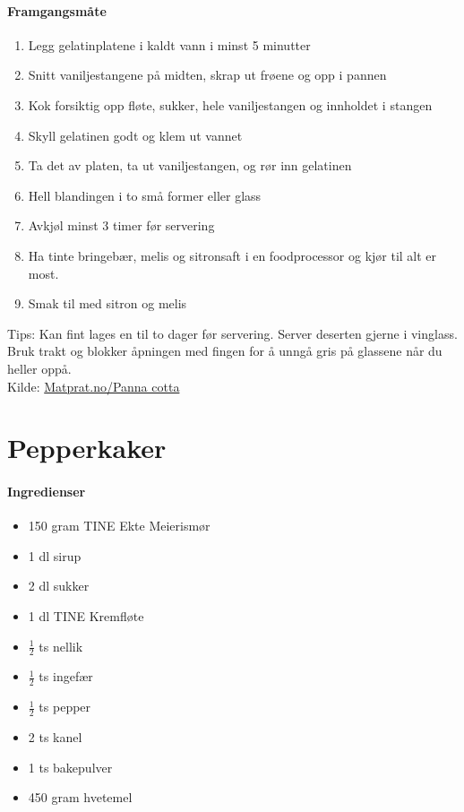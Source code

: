\documentclass[12pt,a4paper]{book}
\begin{document}
\paragraph{Framgangsmåte}
\begin{enumerate}[noitemsep]
	\item Legg gelatinplatene i kaldt vann i minst 5 minutter
	\item Snitt vaniljestangene på midten, skrap ut frøene og opp i pannen
	\item Kok forsiktig opp fløte, sukker, hele vaniljestangen og innholdet i stangen
	\item Skyll gelatinen godt og klem ut vannet
	\item Ta det av platen, ta ut vaniljestangen, og rør inn gelatinen
	\item Hell blandingen i to små former eller glass
	\item Avkjøl minst 3 timer før servering
	\item Ha tinte bringebær, melis og sitronsaft i en foodprocessor og kjør til alt er most.
	\item Smak til med sitron og melis
\end{enumerate}


Tips: Kan fint lages en til to dager før servering. Server deserten gjerne i vinglass. Bruk trakt og blokker åpningen med fingen for å unngå gris på glassene når du heller oppå.\\

Kilde: \href{http://www.matprat.no/gjester/gjesteoppskrifter/panna-cotta/}{Matprat.no/Panna cotta}
\clearpage{}
\clearpage{}\section{﻿Pepperkaker}


\paragraph{Ingredienser}
\begin{itemize}[noitemsep]
	\item 150 gram TINE Ekte Meierismør
	\item 1 dl sirup
	\item 2 dl sukker
	\item 1 dl TINE Kremfløte
	\item $\frac{1}{2}$ ts nellik
	\item $\frac{1}{2}$ ts ingefær
	\item $\frac{1}{2}$ ts pepper
	\item 2 ts kanel
	\item 1 ts bakepulver
	\item 450 gram hvetemel
\end{itemize}
\end{document}
